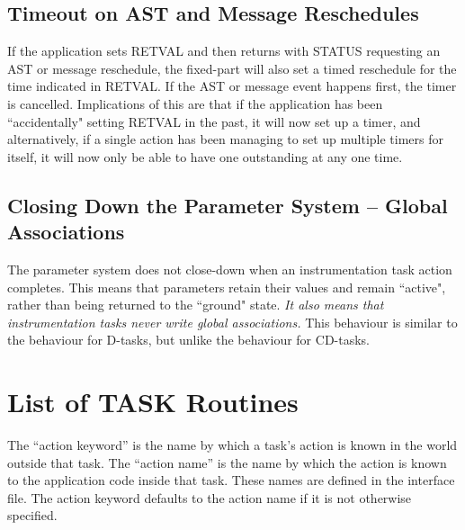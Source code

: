 \subsection{Timeout on AST and Message Reschedules}
If the application sets RETVAL and then returns with STATUS requesting 
an AST or message reschedule, the fixed-part will also set a timed 
reschedule for the time indicated in RETVAL. If the AST or message event 
happens first, the timer is cancelled. Implications of this are that if 
the application has been ``accidentally" setting RETVAL in the past, it 
will now set up a timer, and alternatively, if a single action has been
managing to set up multiple timers for itself, it will now only be able
to have one outstanding at any one time. 

\subsection{Closing Down the Parameter System -- Global Associations}
The parameter system does not close-down when an instrumentation task
action completes. This means that parameters retain their values and
remain ``active", rather than being returned to the ``ground" state.
{\em It also means that instrumentation tasks never write global
associations.}
This behaviour is similar to the behaviour for D-tasks, but unlike the 
behaviour for CD-tasks.

\newpage
\section{List of TASK Routines}
The ``action keyword'' is the name by which a task's action is known in 
the world outside that task. The ``action name'' is the name by which the 
action is known to the application code inside that task. These names 
are defined in the interface file. The action keyword defaults to the 
action name if it is not otherwise specified.

